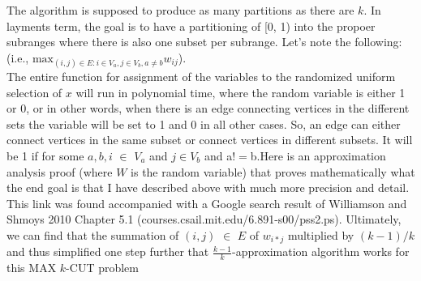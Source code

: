\documentclass[letterpaper, 11pt]{article}
\begin{document}
\newline
The algorithm is supposed to produce as many partitions as there are $k$. In layments term, the goal is to have a partitioning of  [0, 1) into the propoer subranges where there is also one subset per subrange. Let's note the following: (i.e., $\text{max}_{(i,j)\in E:i \in V_a, j\in V_b, a\ne b}w_{ij}$).\\
\newline
The entire function for assignment of the variables to the randomized uniform selection of $x$ will run in polynomial time, where the random variable is either 1 or 0, or in other words, when there is an edge connecting vertices in the different sets the variable will be set to 1 and 0 in all other cases. So, an edge can either connect vertices in the same subset or connect vertices in different subsets. It will be 1 if for some $a,b, i$ $\in$ $V_a$ and $j \in V_b$ and a$!=$b.Here is an approximation analysis proof (where $W$ is the random variable) that proves mathematically what the end goal is that I have described above with much more precision and detail. This link was found accompanied with a Google search result of Williamson and Shmoys 2010 Chapter 5.1 (courses.csail.mit.edu/6.891-s00/pss2.ps). Ultimately, we can find that the summation of $(i,j)$ $\in$ $E$ of $w_{i*j}$ multiplied by $(k-1)/k$ and thus simplified one step further that $\frac{k-1}{k}$-approximation algorithm works for this MAX $k$-CUT problem
\end{document}
